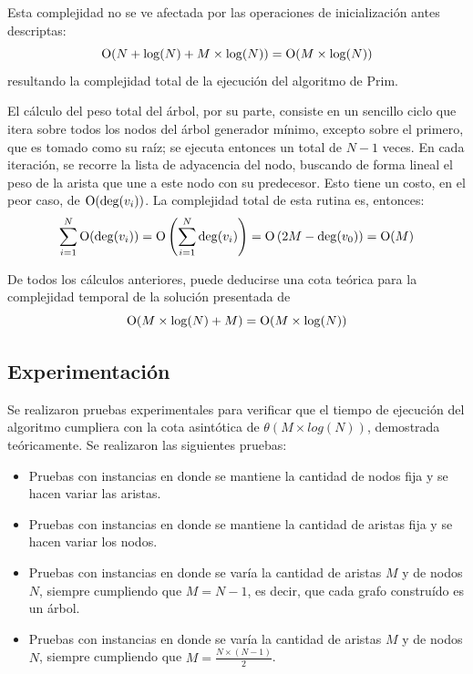     Esta complejidad no se ve afectada por las operaciones de inicialización
    antes descriptas:
    \[ \operatorname{O}(N + \log(N) + M \times \log(N)) = \operatorname{O}(M \times \log(N)) \]
    resultando la complejidad total de la ejecución del algoritmo de Prim.

    \vspace{1.25em}

    El cálculo del peso total del árbol, por su parte, consiste en un
    sencillo ciclo que itera sobre todos los nodos del árbol generador
    mínimo, excepto sobre el primero, que es tomado como su raíz; se ejecuta
    entonces un total de $N - 1$ veces. En cada iteración, se recorre la
    lista de adyacencia del nodo, buscando de forma lineal el peso de la
    arista que une a este nodo con su predecesor. Esto tiene un costo, en el
    peor caso, de $\operatorname{O}(\operatorname{deg}(v_i))$. La complejidad total de
    esta rutina es, entonces:
    \[ \sum_{i=1}^{N} \operatorname{O}(\operatorname{deg}(v_i)) =
                \operatorname{O} \left( \sum_{i=1}^{N} \operatorname{deg}(v_i) \right) =
                \operatorname{O} \left( 2M - \operatorname{deg}(v_0) \right) = \operatorname{O}(M) \]

    \vspace{1.25em}

    De todos los cálculos anteriores, puede deducirse una cota teórica para
    la complejidad temporal de la solución presentada de
    \[ \operatorname{O}(M \times \log(N) + M) = \operatorname{O}(M \times \log(N)) \]

    \subsection{Experimentación}

    Se realizaron pruebas experimentales para verificar que el tiempo de ejecución del algoritmo cumpliera con la cota asintótica de $\theta(M \times log(N))$, demostrada teóricamente. Se realizaron las siguientes pruebas:

    \begin{itemize}
    \item Pruebas con instancias en donde se mantiene la cantidad de nodos fija y se hacen variar las aristas.
    \item Pruebas con instancias en donde se mantiene la cantidad de aristas fija y se hacen variar los nodos.
    \item Pruebas con instancias en donde se varía la cantidad de aristas $M$ y de nodos $N$, siempre cumpliendo que $M = N  - 1$, es decir, que cada grafo construído es un árbol.
    \item Pruebas con instancias en donde se varía la cantidad de aristas $M$ y de nodos $N$, siempre cumpliendo que $M = \frac{N \times (N - 1)}{2}$.
    \end{itemize}

